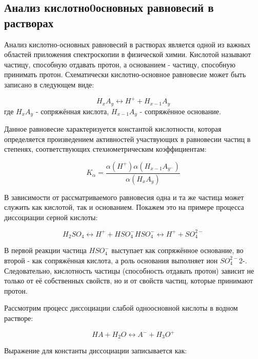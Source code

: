 \documentclass[a4paper,12pt]{article}
\begin{document}
\subsection*{Анализ кислотно0основных равновесий в растворах}

Анализ кислотно-основных равновесий в растворах является одной из важных областей приложения спектроскопии в физической химии.
Кислотой называют частицу, способную отдавать протон, а основанием - частицу, способную принимать протон. Схематически кислотно-основное равновесие может быть записано в следующем виде:

\begin{equation}
    H_xA_y \leftrightarrow H^+ + H_{x-1}A_y
    \nonumber
\end{equation}
где $H_xA_y$ - сопряжённая  кислота, $H_{x-1}A_y$ - сопряжённое основание.

Данное равновесие характеризуется константой кислотности, которая определяется произведением активностей участвующих в равновесии частиц в степенях, соответствующих стехиометрическим коэффициентам:

\begin{equation}
    K_\alpha = \frac{\alpha(H^+)\alpha(H_{x-1}A_{y^-})}{\alpha(H_xA_y)}
\end{equation}

В зависимости от рассматриваемого равновесия одна и та же частица может служить как кислотой, так и основанием. Покажем это на примере процесса диссоциации серной кислоты:

\begin{equation}
    \nonumber
    H_2SO_4 \leftrightarrow H^+ + HSO_4^-
    HSO_4^- \leftrightarrow H^+ + SO_4^{2-}
\end{equation}

В первой реакции частица $ HSO_4^-$ выступает как сопряжённое основание, во второй -
как сопряжённая кислота, а роль основания выполняет ион $SO_4^{2-}$2-. Следовательно,
кислотность частицы (способность отдавать протон) зависит не только от её собственных
свойств, но и от свойств частиц, которые принимают протон. 

Рассмотрим процесс диссоциации слабой одноосновной кислоты в водном растворе:

\begin{equation}
    HA + H_2O \leftrightarrow A^- + H_3O^+
    \nonumber
\end{equation}

Выражение для константы диссоциации записывается как:
\end{document}
